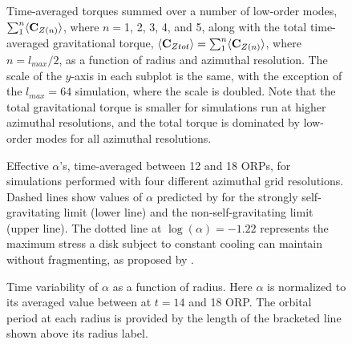 \documentclass[manuscript]{aastex} %
\begin{document}
\begin{figure}
\caption
{
Time-averaged torques summed over a number of low-order modes, 
$\sum_1^n \langle {\rm \bf C}_{Z(n)} \rangle$, where $n = $1,  2, 3, 4, and 5, along
with the total time-averaged gravitational torque,
$\langle {\rm \bf C}_{Ztot} \rangle = \sum_1^n \langle {\rm \bf C}_{Z(n)} \rangle$, where $n =  l_{max}/2$,
as a function of radius and azimuthal resolution. 
The scale of the $y$-axis in each subplot is the same, with the exception of the $l_{max} = 64$ simulation, 
where the scale is doubled.  
Note that the total gravitational torque is smaller for simulations run at higher azimuthal resolutions, and the total torque is dominated by low-order modes for all azimuthal resolutions. 
}
\label{fig:Torque_array}
\end{figure}



\begin{figure}
\caption
{Effective $\alpha$'s, time-averaged between 12 and 18 ORPs, for simulations performed with four different azimuthal grid resolutions. Dashed lines show values of $\alpha$ predicted by  \citet{gammie2001}  for the
strongly self-gravitating limit (lower line) and the non-self-gravitating limit
(upper line).
The dotted line at $\log(\alpha) = -1.22$ represents the maximum stress a disk subject to constant cooling
can maintain without fragmenting, as  proposed by  \cite{rice2005}.
}
\label{fig:alpha_v_radius}
\end{figure}
\newpage

\begin{figure}
\caption
{
Time variability of $\alpha$ as a function of radius.  Here $\alpha$ is normalized to its averaged value between at $t = 14$ and 18 ORP.  The orbital period at each radius is provided by the length of the bracketed line shown above its radius label. 
}
\label{fig:alpha_stack}
\end{figure}
\end{document}
